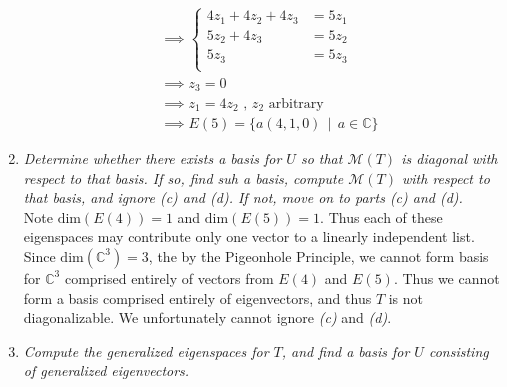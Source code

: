 \documentclass[12pt]{article}
\newcommand{\suchthat}{\, \mid \,}
\begin{document}
\begin{enumerate}[\ \ \it(a)\ \ ]
\begin{align*}
		&\implies \left\{\begin{array}{rl}
			4z_1 + 4z_2 + 4z_3 &= 5z_1 \\
			5z_2 + 4z_3 &= 5z_2 \\
			5z_3 &= 5z_3 \\
		\end{array}\right. \\
		&\implies z_3 = 0 \\
		&\implies z_1 = 4z_2 \text{ , } z_2 \text{ arbitrary} \\
		&\implies E(5) = \{a(4, 1, 0) \suchthat a \in \mathbb{C}\}
	\end{align*}
 	\item {\it Determine whether there exists a basis for $U$ so that $\mathcal{M}(T)$ is diagonal with respect to that basis.  If so, find suh a basis, compute $\mathcal{M}(T)$ with respect to that basis, and ignore (c) and (d).  If not, move on to parts (c) and (d).} \\

	\noindent Note $\text{dim}(E(4)) = 1$ and $\text{dim}(E(5)) = 1$.  Thus each of these eigenspaces may contribute only one vector to a linearly independent list.  Since $\text{dim}(\mathbb{C}^3) = 3$, the by the Pigeonhole Principle, we cannot form basis for $\mathbb{C}^3$ comprised entirely of vectors from $E(4)$ and $E(5)$.  Thus we cannot form a basis comprised entirely of eigenvectors, and thus $T$ is not diagonalizable.  We unfortunately cannot ignore {\it(c)} and {\it(d)}.
	\item {\it Compute the generalized eigenspaces for $T$, and find a basis for $U$ consisting of generalized eigenvectors.}
	

\end{enumerate}
\end{document}
